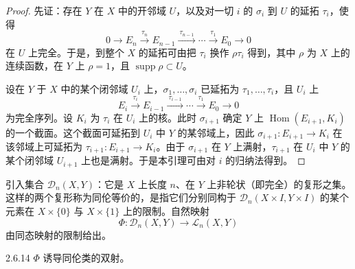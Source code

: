 \begin{proof}
  先证：存在 $Y$ 在 $X$ 中的开邻域 $U$，以及对一切 $i$ 的 $\sigma_i$ 到 $U$ 的延拓 $\tau_i$，使得
  \[
  0\longrightarrow E_n\xrightarrow{\ \tau_n\ }E_{n-1}\xrightarrow{\ \tau_{n-1}\ }\cdots\xrightarrow{\ \tau_1\ }E_0\longrightarrow 0
  \]
  在 $U$ 上完全。于是，到整个 $X$ 的延拓可由把 $\tau_i$ 换作 $\rho\tau_i$ 得到，其中 $\rho$ 为 $X$ 上的连续函数，在 $Y$ 上 $\rho=1$，且 $\operatorname{supp}\rho\subset U$。

  设在 $Y$ 于 $X$ 中的某个闭邻域 $U_i$ 上，$\sigma_1,\dots,\sigma_i$ 已延拓为 $\tau_1,\dots,\tau_i$，且 $U_i$ 上
  \[
  E_i\xrightarrow{\ \tau_i\ }E_{i-1}\xrightarrow{\ \tau_{i-1}\ }\cdots\xrightarrow{\ \tau_1\ }E_0\longrightarrow 0
  \]
  为完全序列。设 $K_i$ 为 $\tau_i$ 在 $U_i$ 上的核。此时 $\sigma_{i+1}$ 确定 $Y$ 上 $\operatorname{Hom}(E_{i+1},K_i)$ 的一个截面。这个截面可延拓到 $U_i$ 中 $Y$ 的某邻域上，因此 $\sigma_{i+1}\colon E_{i+1}\to K_i$ 在该邻域上可延拓为 $\tau_{i+1}\colon E_{i+1}\to K_i$。由于 $\sigma_{i+1}$ 在 $Y$ 上满射，$\tau_{i+1}$ 在 $U_i$ 中 $Y$ 的某个闭邻域 $U_{i+1}$ 上也是满射。于是本引理可由对 $i$ 的归纳法得到。
\end{proof}

引入集合 $\mathcal{D}_n(X,Y)$：它是 $X$ 上长度 $n$、在 $Y$ 上非轮状（即完全）的复形之集。
这样的两个复形称为同伦等价的，是指它们分别同构于 $\mathcal{D}_n(X\times I,Y\times I)$ 的某个元素在 $X\times\{0\}$ 与 $X\times\{1\}$ 上的限制。自然映射
\[
\Phi\colon\mathcal{D}_n(X,Y)\longrightarrow\mathcal{L}_n(X,Y)
\]
由同态映射的限制给出。

\begin{lemma*}{2.6.14}
  $\Phi$ 诱导同伦类的双射。
\end{lemma*}

